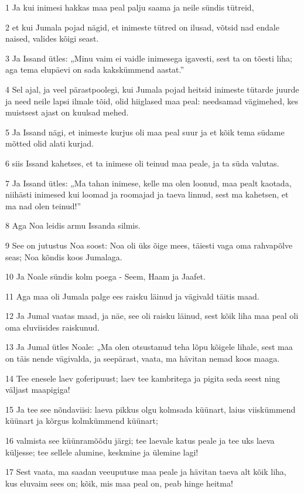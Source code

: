 \par 1 Ja kui inimesi hakkas maa peal palju saama ja neile sündis tütreid,
\par 2 et kui Jumala pojad nägid, et inimeste tütred on ilusad, võtsid nad endale naised, valides kõigi seast.
\par 3 Ja Issand ütles: „Minu vaim ei vaidle inimesega igavesti, sest ta on tõesti liha; aga tema elupäevi on sada kakskümmend aastat.”
\par 4 Sel ajal, ja veel pärastpoolegi, kui Jumala pojad heitsid inimeste tütarde juurde ja need neile lapsi ilmale tõid, olid hiiglased maa peal: needsamad vägimehed, kes muistsest ajast on kuulsad mehed.
\par 5 Ja Issand nägi, et inimeste kurjus oli maa peal suur ja et kõik tema südame mõtted olid alati kurjad.
\par 6 siis Issand kahetses, et ta inimese oli teinud maa peale, ja ta süda valutas.
\par 7 Ja Issand ütles: „Ma tahan inimese, kelle ma olen loonud, maa pealt kaotada, niihästi inimesed kui loomad ja roomajad ja taeva linnud, sest ma kahetsen, et ma nad olen teinud!”
\par 8 Aga Noa leidis armu Issanda silmis.
\par 9 See on jutustus Noa soost: Noa oli üks õige mees, täiesti vaga oma rahvapõlve seas; Noa kõndis koos Jumalaga.
\par 10 Ja Noale sündis kolm poega - Seem, Haam ja Jaafet.
\par 11 Aga maa oli Jumala palge ees raisku läinud ja vägivald täitis maad.
\par 12 Ja Jumal vaatas maad, ja näe, see oli raisku läinud, sest kõik liha maa peal oli oma eluviisides raiskunud.
\par 13 Ja Jumal ütles Noale: „Ma olen otsustanud teha lõpu kõigele lihale, sest maa on täis nende vägivalda, ja seepärast, vaata, ma hävitan nemad koos maaga.
\par 14 Tee enesele laev goferipuust; laev tee kambritega ja pigita seda seest ning väljast maapigiga!
\par 15 Ja tee see nõndaviisi: laeva pikkus olgu kolmsada küünart, laius viiskümmend küünart ja kõrgus kolmkümmend küünart;
\par 16 valmista see küünramõõdu järgi; tee laevale katus peale ja tee uks laeva küljesse; tee sellele alumine, keskmine ja ülemine lagi!
\par 17 Sest vaata, ma saadan veeuputuse maa peale ja hävitan taeva alt kõik liha, kus eluvaim sees on; kõik, mis maa peal on, peab hinge heitma!
